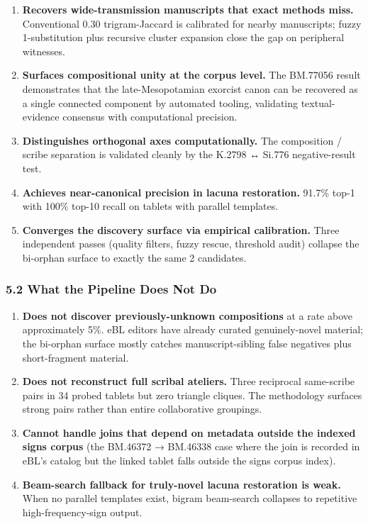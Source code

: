 \documentclass[
  11pt,
  letterpaper,
]{article}
\providecommand{\tightlist}{%
  \setlength{\itemsep}{0pt}\setlength{\parskip}{0pt}}
\begin{document}
\begin{enumerate}
\def\labelenumi{\arabic{enumi}.}
\tightlist
\item
  \textbf{Recovers wide-transmission manuscripts that exact methods
  miss.} Conventional 0.30 trigram-Jaccard is calibrated for nearby
  manuscripts; fuzzy 1-substitution plus recursive cluster expansion
  close the gap on peripheral witnesses.
\item
  \textbf{Surfaces compositional unity at the corpus level.} The
  BM.77056 result demonstrates that the late-Mesopotamian exorcist canon
  can be recovered as a single connected component by automated tooling,
  validating textual-evidence consensus with computational precision.
\item
  \textbf{Distinguishes orthogonal axes computationally.} The
  composition / scribe separation is validated cleanly by the K.2798 ↔
  Si.776 negative-result test.
\item
  \textbf{Achieves near-canonical precision in lacuna restoration.}
  91.7\% top-1 with 100\% top-10 recall on tablets with parallel
  templates.
\item
  \textbf{Converges the discovery surface via empirical calibration.}
  Three independent passes (quality filters, fuzzy rescue, threshold
  audit) collapse the bi-orphan surface to exactly the same 2
  candidates.
\end{enumerate}

\subsubsection{5.2 What the Pipeline Does Not
Do}\label{what-the-pipeline-does-not-do}

\begin{enumerate}
\def\labelenumi{\arabic{enumi}.}
\tightlist
\item
  \textbf{Does not discover previously-unknown compositions} at a rate
  above approximately 5\%. eBL editors have already curated
  genuinely-novel material; the bi-orphan surface mostly catches
  manuscript-sibling false negatives plus short-fragment material.
\item
  \textbf{Does not reconstruct full scribal ateliers.} Three reciprocal
  same-scribe pairs in 34 probed tablets but zero triangle cliques. The
  methodology surfaces strong pairs rather than entire collaborative
  groupings.
\item
  \textbf{Cannot handle joins that depend on metadata outside the
  indexed signs corpus} (the BM.46372 → BM.46338 case where the join is
  recorded in eBL's catalog but the linked tablet falls outside the
  signs corpus index).
\item
  \textbf{Beam-search fallback for truly-novel lacuna restoration is
  weak.} When no parallel templates exist, bigram beam-search collapses
  to repetitive high-frequency-sign output.
\end{enumerate}
\end{document}

